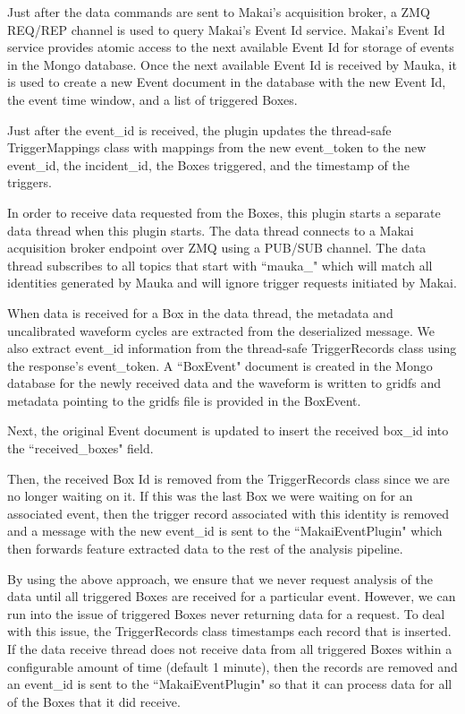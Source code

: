 Just after the data commands are sent to Makai's acquisition broker, a ZMQ REQ/REP channel is used to query Makai's Event Id service. Makai's Event Id service provides atomic access to the next available Event Id for storage of events in the Mongo database. Once the next available Event Id is received by Mauka, it is used to create a new Event document in the database with the new Event Id, the event time window, and a list of triggered Boxes.

Just after the event\_id is received, the plugin updates the thread-safe TriggerMappings class with mappings from the new event\_token to the new event\_id, the incident\_id, the Boxes triggered, and the timestamp of the triggers.

In order to receive data requested from the Boxes, this plugin starts a separate data thread when this plugin starts. The data thread connects to a Makai acquisition broker endpoint over ZMQ using a PUB/SUB channel. The data thread subscribes to all topics that start with ``mauka\_" which will match all identities generated by Mauka and will ignore trigger requests initiated by Makai.

When data is received for a Box in the data thread, the metadata and uncalibrated waveform cycles are extracted from the deserialized message. We also extract event\_id information from the thread-safe TriggerRecords class using the response's event\_token. A ``BoxEvent" document is created in the Mongo database for the newly received data and the waveform is written to gridfs and metadata pointing to the gridfs file is provided in the BoxEvent.

Next, the original Event document is updated to insert the received box\_id into the ``received\_boxes" field.

Then, the received Box Id is removed from the TriggerRecords class since we are no longer waiting on it. If this was the last Box we were waiting on for an associated event, then the trigger record associated with this identity is removed and a message with the new event\_id is sent to the ``MakaiEventPlugin" which then forwards feature extracted data to the rest of the analysis pipeline.

By using the above approach, we ensure that we never request analysis of the data until all triggered Boxes are received for a particular event. However, we can run into the issue of triggered Boxes never returning data for a request. To deal with this issue, the TriggerRecords class timestamps each record that is inserted. If the data receive thread does not receive data from all triggered Boxes within a configurable amount of time (default 1 minute), then the records are removed and an event\_id is sent to the ``MakaiEventPlugin" so that it can process data for all of the Boxes that it did receive.

